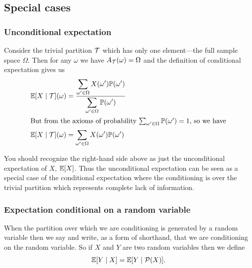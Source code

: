 \documentclass[11pt,reqno,openany]{amsbook}
\begin{document}
\subsection{Special cases}
\subsubsection{Unconditional expectation}
Consider the trivial partition $\mathcal{T}$ which has only
one element---the full sample space $\Omega$. Then for any
$\omega$ we have $A_{\mathcal{T}}(\omega)=\Omega$ and the
definition of conditional expectation gives us
\begin{align*}
  \mathbb{E}[X\mid\mathcal{T}](\omega) 
  &= \frac{\displaystyle \sum_{\omega' \in \Omega} 
    X(\omega')\mathbb{P}(\omega')}
  {\displaystyle\sum_{\omega' \in \Omega} 
    \mathbb{P}(\omega')}\\
  \intertext{But from the axioms of probability
    $\sum_{\omega' \in \Omega} \mathbb{P}(\omega')=1$, so we have}
  \mathbb{E}[X\mid\mathcal{T}](\omega) 
  &= \sum_{\omega' \in \Omega} 
    X(\omega')\mathbb{P}(\omega')
\end{align*}

You should recognize the right-hand side above as just the
unconditional expectation of $X$, $\mathbb{E}[X]$. Thus the
unconditional expectation can be seen as a special case of
the conditional expectation where the conditioning is over
the trivial partition which represents complete lack of
information.

\subsubsection{Expectation conditional on a random variable}
When the partition over which we are conditioning is
generated by a random variable then we say and write, as a
form of shorthand, that we are conditioning on the random
variable. So if $X$ and $Y$ are two random variables then we
define
\[\mathbb{E}[Y \mid X] = \mathbb{E}[Y \mid \mathcal{P}(X)].\]
\end{document}
